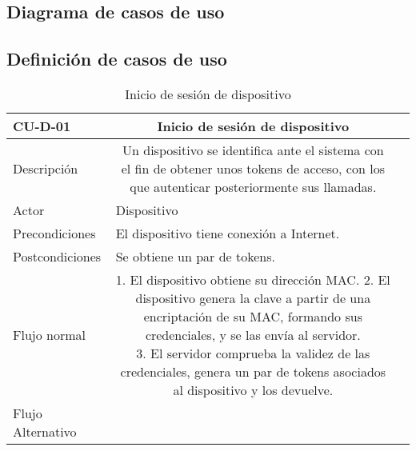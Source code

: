 \subsection{Diagrama de casos de uso}

\subsection{Definición de casos de uso}


\begin{table}[]
\centering
	\setlength{\extrarowheight}{3pt}
		\begin{tabular}{rc{1.85cm}|c{8cm}}
	    \hline
        \multicolumn{1}{|l}{ \textbf{CU-D-01}}     & \multicolumn{1}{c|}{\textbf{Inicio de sesión de dispositivo}  } \\
	    \hline \hline
	    \multicolumn{1}{|l}{Descripción}     & \multicolumn{1}{Y|}{
	    Un dispositivo se identifica ante el sistema con el fin de obtener unos tokens de acceso, con los que autenticar posteriormente sus llamadas.
	    }  \\ \cline{1-2}
	    \multicolumn{1}{|l}{Actor}           & \multicolumn{1}{l|}{Dispositivo}  \\ \cline{1-2}
	    \multicolumn{1}{|l}{Precondiciones}  & \multicolumn{1}{l|}{El dispositivo tiene conexión a Internet.}  \\ \cline{1-2}
	    \multicolumn{1}{|l}{Postcondiciones} & \multicolumn{1}{l|}{Se obtiene un par de tokens.}\\ \cline{1-2}
	    \multicolumn{1}{|l}{Flujo normal}    & \multicolumn{1}{Y|}{
1. El dispositivo obtiene su dirección MAC.
2. El dispositivo genera la clave a partir de una encriptación de su MAC, formando sus credenciales, y se las envía al servidor. \newline
3. El servidor comprueba la validez de las credenciales, genera un par de tokens asociados al dispositivo y los devuelve. \newline
	    } \\ \cline{1-2}
	    \multicolumn{1}{|l}{Flujo Alternativo} & \multicolumn{1}{l|}{}\\ \cline{1-2}
	    \hline
	    \end{tabular}
	\label{table:cu-d-01}
	\caption{Inicio de sesión de dispositivo}
\end{table}


